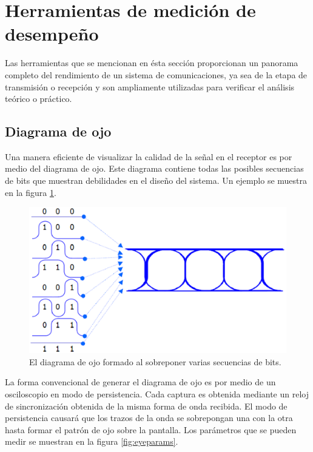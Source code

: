 
\section{Herramientas de medici\'on de desempe\~no}
Las herramientas que se mencionan en \'esta secci\'on proporcionan un panorama completo del
rendimiento de un sistema de comunicaciones, ya sea de la etapa de transmisi\'on o recepci\'on y
son ampliamente utilizadas para verificar el an\'alisis te\'orico o pr\'actico.

\subsection{Diagrama de ojo}
Una manera eficiente de visualizar la calidad de la se\~nal en el receptor es por medio del diagrama
de ojo. Este diagrama contiene todas las posibles secuencias de bits que muestran debilidades en el
dise\~no del sistema. Un ejemplo se muestra en la figura \ref{fig:eyeform}\cite{foster}.

\begin{figure}[htp]
\centering
	\includegraphics[width=5.5in]{figs/eyeform}
	\caption{El diagrama de ojo formado al sobreponer varias secuencias de bits.}
	\label{fig:eyeform}
\end{figure}

La forma convencional de generar el diagrama de ojo es por medio de un osciloscopio en modo de
persistencia. Cada captura es obtenida mediante un reloj de sincronizaci\'on obtenida de la misma
forma de onda recibida. El modo de persistencia causar\'a que los trazos de la onda se sobrepongan
una con la otra hasta formar el patr\'on de ojo sobre la pantalla. Los par\'ametros que se pueden
medir se muestran en la figura \ref{fig:eyeparams}\cite{breed}.

